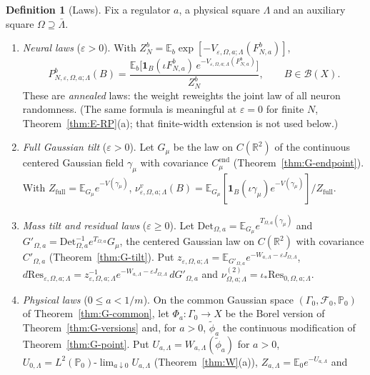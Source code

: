 \documentclass[11pt]{article}
\theoremstyle{plain}
\theoremstyle{definition}
\newtheorem{definition}[theorem]{Definition}
\theoremstyle{remark}
\newcommand{\R}{\mathbb{R}}
\newcommand{\E}{\mathbb{E}}
\newcommand{\PP}{\mathbb{P}}
\newcommand{\cB}{\mathcal{B}}
\newcommand{\cF}{\mathcal{F}}
\newcommand{\ind}{\mathbf{1}}
\newcommand{\Cend}{C^{\mathrm{end}}_{\mu}}
\newcommand{\Res}{\mathrm{Res}}
\newcommand{\Det}{\mathrm{Det}}
\begin{document}
\begin{definition}[Laws]\label{def:laws}
Fix a regulator $a$, a physical square $\Lambda$ and an auxiliary square
$\Omega\supseteq\bar\Lambda$.
\begin{enumerate}[label=(\alph*)]
\item \emph{Neural laws} ($\varepsilon>0$). With
  $Z^{b}_{N}=\E_b\exp[-V_{\varepsilon,\Omega,a;\Lambda}(F^{b}_{N,a})]$,
  \begin{equation}\label{eq:neurallaw}
  P^{b}_{N,\varepsilon,\Omega,a;\Lambda}(B)=\frac{\E_b\bigl[\ind_{B}(\iota F^{b}_{N,a})\,
  e^{-V_{\varepsilon,\Omega,a;\Lambda}(F^{b}_{N,a})}\bigr]}{Z^{b}_{N}},\qquad B\in\cB(X).
  \end{equation}
  These are \emph{annealed} laws: the weight reweights the joint law of all
  neuron randomness. (The same formula is meaningful at $\varepsilon=0$ for
  finite $N$, Theorem~\ref{thm:E-RP}(a); that finite-width extension is not
  used below.)
\item \emph{Full Gaussian tilt} ($\varepsilon>0$). Let $G_\mu$ be the law on
  $C(\R^{2})$ of the continuous centered Gaussian field $\gamma_\mu$ with
  covariance $\Cend$ (Theorem~\ref{thm:G-endpoint}). With
  $Z_{\mathrm{full}}=\E_{G_\mu}e^{-V(\gamma_\mu)}$,
  $\nu^{v}_{\varepsilon,\Omega,a;\Lambda}(B)
  =\E_{G_\mu}[\ind_B(\iota\gamma_\mu)e^{-V(\gamma_\mu)}]/Z_{\mathrm{full}}$.
\item \emph{Mass tilt and residual laws} ($\varepsilon\ge0$). Let
  $\Det_{\Omega,a}=\E_{G_\mu}e^{T_{\Omega,a}(\gamma_\mu)}$ and
  $G'_{\Omega,a}=\Det_{\Omega,a}^{-1}e^{T_{\Omega,a}}G_\mu$, the centered
  Gaussian law on $C(\R^{2})$ with covariance $C'_{\Omega,a}$
  (Theorem~\ref{thm:G-tilt}). Put
  $z_{\varepsilon,\Omega,a;\Lambda}=\E_{G'_{\Omega,a}}e^{-W_{a,\Lambda}-\varepsilon J_{\Omega,\Lambda}}$,
  $d\Res_{\varepsilon,\Omega,a;\Lambda}=z^{-1}_{\varepsilon,\Omega,a;\Lambda}
  e^{-W_{a,\Lambda}-\varepsilon J_{\Omega,\Lambda}}\,dG'_{\Omega,a}$ and
  $\nu^{(2)}_{\Omega,a;\Lambda}=\iota_{*}\Res_{0,\Omega,a;\Lambda}$.
\item \emph{Physical laws} ($0\le a<1/m$). On the common Gaussian space
  $(\Gamma_0,\cF_0,\PP_0)$ of Theorem~\ref{thm:G-common}, let
  $\Phi_a:\Gamma_0\to X$ be the Borel version of Theorem~\ref{thm:G-versions}
  and, for $a>0$, $\tilde\phi_a$ the continuous modification of
  Theorem~\ref{thm:G-point}. Put $U_{a,\Lambda}=W_{a,\Lambda}(\tilde\phi_a)$ for
  $a>0$, $U_{0,\Lambda}=L^{2}(\PP_0)\text{-}\lim_{a\downarrow0}U_{a,\Lambda}$
  (Theorem~\ref{thm:W}(a)), $Z_{a,\Lambda}=\E_0e^{-U_{a,\Lambda}}$ and

\end{enumerate}
\end{definition}
\end{document}
